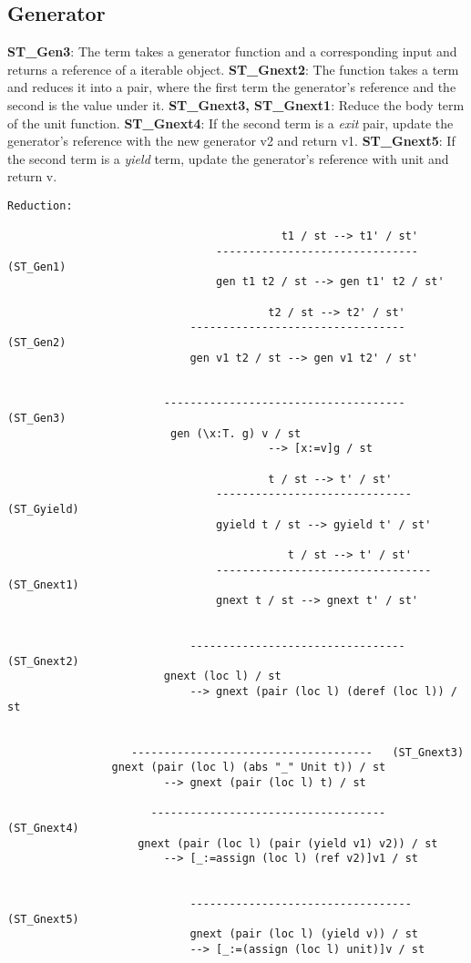\subsection{Generator}
\textbf{ST_Gen3}: The \gen term takes a generator function and a corresponding input and returns a reference of a iterable object.
\textbf{ST_Gnext2}: The \nt function takes a \gen term and reduces it into a pair, where the first term the generator's reference and the second is the value under it.
\textbf{ST_Gnext3, ST_Gnext1}: Reduce the body term of the unit function.
\textbf{ST_Gnext4}: If the second term is a \textit{exit} pair, update the generator's reference with the new generator v2 and return v1.
\textbf{ST_Gnext5}: If the second term is a \textit{yield} term, update the generator's reference with unit and return v.
\begin{lstlisting}
Reduction:

										  t1 / st --> t1' / st'
								-------------------------------   (ST_Gen1)
								gen t1 t2 / st --> gen t1' t2 / st'

										t2 / st --> t2' / st'
							---------------------------------   (ST_Gen2)
							gen v1 t2 / st --> gen v1 t2' / st'
							  
							  
						------------------------------------- (ST_Gen3)
						 gen (\x:T. g) v / st
										--> [x:=v]g / st
													
									    t / st --> t' / st'
								------------------------------   (ST_Gyield)
								gyield t / st --> gyield t' / st'
													
										   t / st --> t' / st'
								---------------------------------  (ST_Gnext1)
								gnext t / st --> gnext t' / st'
								

							---------------------------------   (ST_Gnext2)
						gnext (loc l) / st 
							--> gnext (pair (loc l) (deref (loc l)) / st
								
						
				   -------------------------------------   (ST_Gnext3)
				gnext (pair (loc l) (abs "_" Unit t)) / st
						--> gnext (pair (loc l) t) / st
								
					  ------------------------------------    (ST_Gnext4)
					gnext (pair (loc l) (pair (yield v1) v2)) / st
						--> [_:=assign (loc l) (ref v2)]v1 / st
								
								
							----------------------------------   (ST_Gnext5)
							gnext (pair (loc l) (yield v)) / st
							--> [_:=(assign (loc l) unit)]v / st
												
\end{lstlisting}

